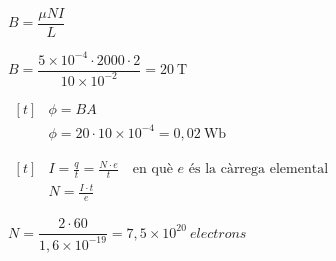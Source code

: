 \begin{solapartat}
$B = \dfrac{\mu NI}{L}$

\medskip
{} $B = \dfrac{5\times 10^{-4}\cdot 2000\cdot 2}{10\times 10^{-2}} = 20\ \mathrm{T}$

\medskip
{}
$\begin{aligned}[t]
&\phi = BA\\
&\phi = 20\cdot 10\times 10^{-4} = 0,02\ \mathrm{Wb}
\end{aligned}$
\end{solapartat}

\begin{solapartat}
$\begin{aligned}[t]
&I = \frac{q}{t} = \frac{N\cdot e}{t} \quad \text{en què } e \text{ és la càrrega elemental}\\
&N = \frac{I\cdot t}{e}
\end{aligned}$

\medskip
{} $N = \dfrac{2\cdot 60}{1,6\times 10^{-19}} = 7,5\times 10^{20}\ \textit{electrons}$
\end{solapartat}
